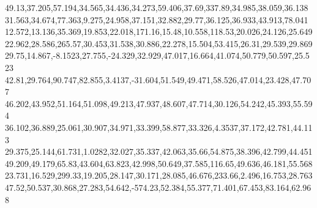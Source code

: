 49.13,37.205,57.194,34.565,34.436,34.273,59.406,37.69,337.89,34.985,38.059,36.138
31.563,34.674,77.363,9.275,24.958,37.151,32.882,29.77,36.125,36.933,43.913,78.041
12.572,13.136,35.369,19.853,22.018,171.16,15.48,10.558,118.53,20.026,24.126,25.649
22.962,28.586,265.57,30.453,31.538,30.886,22.278,15.504,53.415,26.31,29.539,29.869
29.75,14.867,-8.1523,27.755,-24.329,32.929,47.017,16.664,41.074,50.779,50.597,25.523
42.81,29.764,90.747,82.855,3.4137,-31.604,51.549,49.471,58.526,47.014,23.428,47.707
46.202,43.952,51.164,51.098,49.213,47.937,48.607,47.714,30.126,54.242,45.393,55.594
36.102,36.889,25.061,30.907,34.971,33.399,58.877,33.326,4.3537,37.172,42.781,44.113
29.375,25.144,61.731,1.0282,32.027,35.337,42.063,35.66,54.875,38.396,42.799,44.451
49.209,49.179,65.83,43.604,63.823,42.998,50.649,37.585,116.65,49.636,46.181,55.568
23.731,16.529,299.33,19.205,28.147,30.171,28.085,46.676,233.66,2.496,16.753,28.763
47.52,50.537,30.868,27.283,54.642,-574.23,52.384,55.377,71.401,67.453,83.164,62.968
